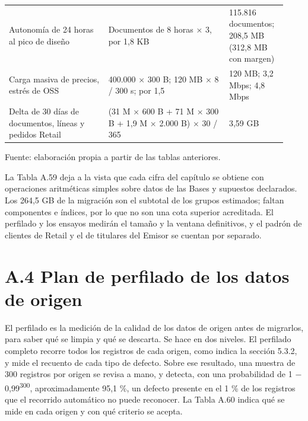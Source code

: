 \documentclass[11pt]{article}
\begin{document}
\begin{table}[htbp]
\begin{tabular}{@{}p{0.333\linewidth}p{0.404\linewidth}p{0.190\linewidth}@{}}
Autonomía de 24 horas al pico de diseño & Documentos de 8 horas × 3, por 1,8 KB & 115.816 documentos; 208,5 MB (312,8 MB con margen) \\
Carga masiva de precios, estrés de OSS & 400.000 × 300 B; 120 MB × 8 / 300 s; por 1,5 & 120 MB; 3,2 Mbps; 4,8 Mbps \\
Delta de 30 días de documentos, líneas y pedidos Retail & (31 M × 600 B + 71 M × 300 B + 1,9 M × 2.000 B) × 30 / 365 & 3,59 GB \\
\bottomrule
\end{tabular}
\par\smallskip
{\raggedright Fuente: elaboración propia a partir de las tablas anteriores.\par}
\end{table}


La Tabla A.59 deja a la vista que cada cifra del capítulo se obtiene con operaciones aritméticas simples sobre datos de las Bases y supuestos declarados. Los 264,5 GB de la migración son el subtotal de los grupos estimados; faltan componentes e índices, por lo que no son una cota superior acreditada. El perfilado y los ensayos medirán el tamaño y la ventana definitivos, y el padrón de clientes de Retail y el de titulares del Emisor se cuentan por separado.

\section{A.4 Plan de perfilado de los datos de origen}

El perfilado es la medición de la calidad de los datos de origen antes de migrarlos, para saber qué se limpia y qué se descarta. Se hace en dos niveles. El perfilado completo recorre todos los registros de cada origen, como indica la sección 5.3.2, y mide el recuento de cada tipo de defecto. Sobre ese resultado, una muestra de 300 registros por origen se revisa a mano, y detecta, con una probabilidad de 1 $-$ 0,99\textsuperscript{300}, aproximadamente 95,1 \%, un defecto presente en el 1 \% de los registros que el recorrido automático no puede reconocer. La Tabla A.60 indica qué se mide en cada origen y con qué criterio se acepta.
\end{document}
